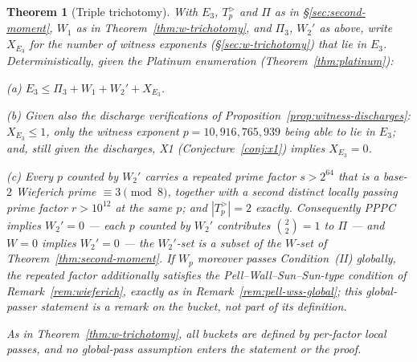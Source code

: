 \documentclass[11pt]{amsart}
\theoremstyle{plain}
\newtheorem{theorem}{Theorem}[section]
\theoremstyle{definition}
\theoremstyle{remark}
\numberwithin{equation}{section}
\begin{document}
\begin{theorem}[Triple trichotomy]\label{thm:triple-trichotomy}
With $E_3$, $T_p^{>}$ and $\Pi$ as in \S\ref{sec:second-moment}, $W_1$ as in Theorem~\ref{thm:w-trichotomy}, and $\Pi_3$, $W_2'$ as above, write $X_{E_3}$ for the number of witness exponents (\S\ref{sec:w-trichotomy}) that lie in $E_3$. Deterministically, given the Platinum enumeration (Theorem~\ref{thm:platinum}):

(a) $E_3 \leq \Pi_3 + W_1 + W_2' + X_{E_3}$.

(b) Given also the discharge verifications of Proposition~\ref{prop:witness-discharges}: $X_{E_3} \leq 1$, only the witness exponent $p = 10{,}916{,}765{,}939$ being able to lie in $E_3$; and, still given the discharges, X1 (Conjecture~\ref{conj:x1}) implies $X_{E_3} = 0$.

(c) Every $p$ counted by $W_2'$ carries a repeated prime factor $s > 2^{64}$ that is a base-$2$ Wieferich prime $\equiv 3 \pmod 8$, together with a second distinct locally passing prime factor $r > 10^{12}$ at the same $p$; and $|T_p^{>}| = 2$ exactly. Consequently PPPC implies $W_2' = 0$ --- each $p$ counted by $W_2'$ contributes $\binom{2}{2} = 1$ to $\Pi$ --- and $W = 0$ implies $W_2' = 0$ --- the $W_2'$-set is a subset of the $W$-set of Theorem~\ref{thm:second-moment}. If $W_p$ moreover passes Condition~(II) \emph{globally}, the repeated factor additionally satisfies the Pell--Wall--Sun--Sun-type condition of Remark~\ref{rem:wieferich}, exactly as in Remark~\ref{rem:pell-wss-global}; this global-passer statement is a remark on the bucket, not part of its definition.

As in Theorem~\ref{thm:w-trichotomy}, all buckets are defined by per-factor \emph{local} passes, and no global-pass assumption enters the statement or the proof.
\end{theorem}
\end{document}
